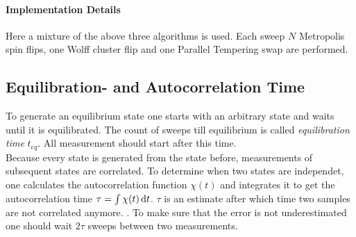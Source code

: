     \paragraph{Implementation Details}
        Here a mixture of the above three algorithms is used.
        Each sweep \(N\) Metropolis spin flips, one Wolff cluster flip
        and one Parallel Tempering swap are performed.

\subsection{Equilibration- and Autocorrelation Time}
    To generate an equilibrium state one starts with an arbitrary state
    and waits until it is equilibrated. The count of sweeps till
    equilibrium is called \emph{equilibration time} \(t_{eq}\).
    All measurement should start after this time.
    \\
    Because every state is generated from the state before, measurements
    of subsequent states are correlated. To determine when two states
    are independet, one calculates the autocorrelation function \(\chi(t)\)
    and integrates it to get the autocorrelation time \(\tau = \int \chi(t) \,\mathrm{d} t\).
    \(\tau\) is an estimate after which time two samples are not
    correlated anymore. \cite[S. ??]{NewmanBarkema1999} \cite[S. 150f]{Katzgraber2011}.
    To make sure that the error is not underestimated one should wait
    \(2\tau\) sweeps between two measurements.

